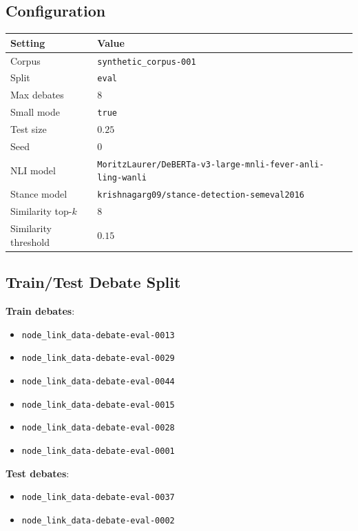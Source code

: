 \documentclass[11pt,a4paper]{article}
\begin{document}
\subsection{Configuration}
\begin{center}
\begin{tabular}{ll}
\toprule
Setting & Value \\
\midrule
Corpus & \texttt{synthetic\_corpus-001} \\
Split & \texttt{eval} \\
Max debates & \(8\) \\
Small mode & \texttt{true} \\
Test size & \(0.25\) \\
Seed & \(0\) \\
NLI model & \texttt{MoritzLaurer/DeBERTa-v3-large-mnli-fever-anli-ling-wanli} \\
Stance model & \texttt{krishnagarg09/stance-detection-semeval2016} \\
Similarity top-\(k\) & \(8\) \\
Similarity threshold & \(0.15\) \\
\bottomrule
\end{tabular}
\end{center}

\subsection{Train/Test Debate Split}
\textbf{Train debates}:
\begin{itemize}[leftmargin=1.5em]
  \item \texttt{node\_link\_data-debate-eval-0013}
  \item \texttt{node\_link\_data-debate-eval-0029}
  \item \texttt{node\_link\_data-debate-eval-0044}
  \item \texttt{node\_link\_data-debate-eval-0015}
  \item \texttt{node\_link\_data-debate-eval-0028}
  \item \texttt{node\_link\_data-debate-eval-0001}
\end{itemize}

\textbf{Test debates}:
\begin{itemize}[leftmargin=1.5em]
  \item \texttt{node\_link\_data-debate-eval-0037}
  \item \texttt{node\_link\_data-debate-eval-0002}
\end{itemize}
\end{document}
